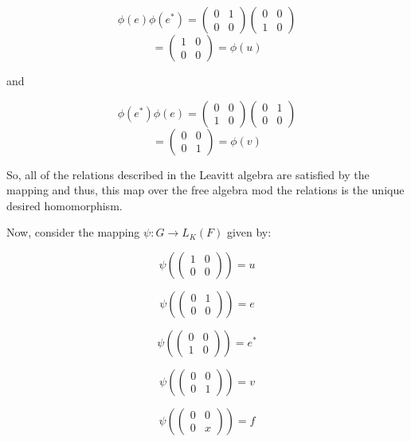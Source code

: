 \begin{solution}
    $$\phi(e)\phi(e^*)=\left(\begin{array}{cc} 0 & 1 \\ 0 & 0 \end{array}\right)
    \left(\begin{array}{cc} 0 & 0 \\ 1 & 0 \end{array}\right)$$
    $$=\left(\begin{array}{cc} 1 & 0 \\ 0 & 0 \end{array}\right)=\phi(u)$$

    and

    $$\phi(e^*)\phi(e)=\left(\begin{array}{cc} 0 & 0 \\ 1 & 0 \end{array}\right)
    \left(\begin{array}{cc} 0 & 1 \\ 0 & 0 \end{array}\right)$$
    $$=\left(\begin{array}{cc} 0 & 0 \\ 0 & 1 \end{array}\right)=\phi(v)$$

    So, all of the relations described in the Leavitt algebra are satisfied by the mapping and thus,
    this map over the free algebra mod the relations is the unique desired homomorphism.

    Now, consider the mapping $\psi:G\rightarrow L_K(F)$ given by:

    $$\psi(\left(\begin{array}{cc} 1 & 0 \\ 0 & 0 \end{array}\right))=u$$

    $$\psi(\left(\begin{array}{cc} 0 & 1 \\ 0 & 0 \end{array}\right))=e$$

    $$\psi(\left(\begin{array}{cc} 0 & 0 \\ 1 & 0 \end{array}\right))=e^*$$

    $$\psi(\left(\begin{array}{cc} 0 & 0 \\ 0 & 1 \end{array}\right))=v$$

    $$\psi(\left(\begin{array}{cc} 0 & 0 \\ 0 & x \end{array}\right))=f$$


\end{solution}
